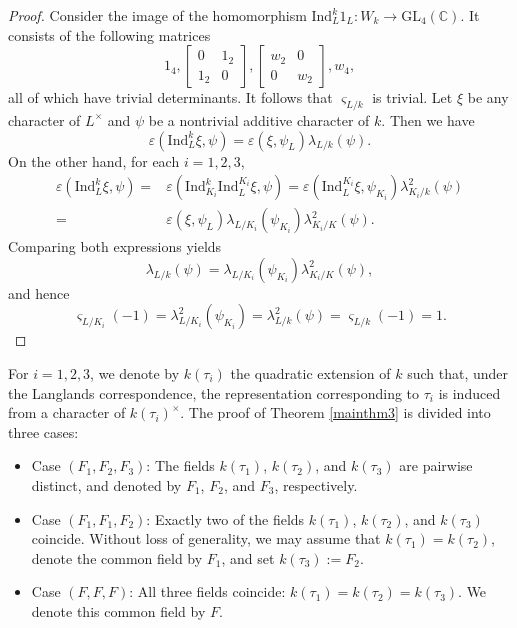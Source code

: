 \documentclass[12pt]{amsart}
\newcommand{\GL}{{\mathrm{GL}}}
\theoremstyle{Theorem}
\theoremstyle{Theorem}
\theoremstyle{Theorem}
\theoremstyle{Theorem}
\theoremstyle{Plain}
\theoremstyle{remark}
\theoremstyle{remark}
\theoremstyle{Definition}
\begin{document}
\begin{proof}
    Consider the image of the homomorphism $ \mathrm{Ind}^k_L 1_L: W_k \rightarrow \GL_4( \mathbb{C} )$. It consists of the following matrices
    \[
        1_4,
        \begin{bmatrix}
            0   & 1_2\\
            1_2 & 0
        \end{bmatrix}
        ,
        \begin{bmatrix}
            w_2 & 0  \\
            0   & w_2
        \end{bmatrix}
        , w_4,
    \]
    all of which have trivial determinants. It follows that $ \varsigma_{ L/k } $ is trivial. Let $\xi$ be any character of $L^\times$ and $\psi$ be a nontrivial additive character of $k$. Then we have
    \[
        \varepsilon \left( \mathrm{Ind}^k_L \xi, \psi \right) = \varepsilon( \xi, \psi_L ) \lambda_{ L/k } ( \psi ).
    \]
    On the other hand, for each $ i = 1, 2, 3 $,
    \[
        \begin{aligned}
            \varepsilon \left( \mathrm{Ind}^k_L \xi, \psi \right) =& \varepsilon \left( \mathrm{Ind}^{k}_{ K_i } \mathrm{Ind}^{ K_i }_{L} \xi, \psi \right) = \varepsilon \left( \mathrm{Ind}^{K_i}_L \xi, \psi_{K_i} \right) \lambda_{ K_i/k }^2 ( \psi )   \\
                                                                  =& \varepsilon( \xi, \psi_L ) \lambda_{ L/K_i } \left( \psi_{ K_i } \right) \lambda_{ K_i/K }^2 ( \psi ).
        \end{aligned}
    \]
    Comparing both expressions yields 
    \[
        \lambda_{ L/k } ( \psi ) = \lambda_{ L/K_i } \left( \psi_{ K_i } \right) \lambda_{ K_i/K }^2 ( \psi ),
    \]
    and hence
    \[
        \varsigma_{ L/K_i } (-1) = \lambda^2_{ L/K_i } ( \psi_{ K_i } ) = \lambda^2_{ L/k } ( \psi ) = \varsigma_{ L/k } (-1) = 1.
    \]
\end{proof}
    
For $ i = 1, 2, 3 $, we denote by $ k(\tau_i) $ the quadratic extension of $k$ such that, under the Langlands correspondence, the representation corresponding to $\tau_i$ is induced from a character of $ k( \tau_i )^\times $. The proof of Theorem \ref{mainthm3} is divided into three cases: 
\begin{itemize}
    \item Case $ ( F_1, F_2, F_3 ) $: The fields $ k( \tau_1 ) $, $ k( \tau_2 ) $, and $ k( \tau_3 ) $ are pairwise distinct, and denoted by $F_1$, $F_2$, and $F_3$, respectively.
    \item Case $ ( F_1, F_1, F_2 ) $: Exactly two of the fields $ k( \tau_1 ) $, $ k( \tau_2 ) $, and $ k( \tau_3 ) $ coincide. Without loss of generality, we may assume that $ k( \tau_1 ) = k( \tau_2 ) $, denote the common field by $F_1$, and set $ k( \tau_3 ) := F_2 $.
    \item Case $ ( F, F, F ) $: All three fields coincide: $ k( \tau_1 ) = k( \tau_2 ) = k( \tau_3 ) $. We denote this common field by $F$.  
\end{itemize}
 
\end{document}
